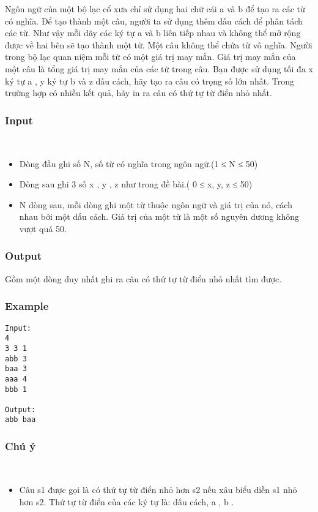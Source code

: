 

Ngôn ngữ của một bộ lạc cổ xưa chỉ sử dụng hai chữ cái a và b để tạo ra các từ có nghĩa. Để tạo thành một câu, người ta sử dụng thêm dấu cách để phân tách các từ. Như vậy mỗi dãy các ký tự a và b liên tiếp nhau và không thể mở rộng được về hai bên sẽ tạo thành một từ. Một câu không thể chứa từ vô nghĩa. Người trong bộ lạc quan niệm mỗi từ có một giá trị may mắn. Giá trị may mắn của một câu là tổng giá trị may mắn của các từ trong câu. Bạn được sử dụng tối đa x ký tự a , y ký tự b và z dấu cách, hãy tạo ra câu có trọng số lớn nhất. Trong trường hợp có nhiều kết quả, hãy in ra câu có thứ tự từ điển nhỏ nhất.

\subsubsection{Input}

 
\begin{itemize}
	\item Dòng đầu ghi số N, số từ có nghĩa trong ngôn ngữ.(1 ≤ N ≤ 50)
	\item Dòng sau ghi 3 số x , y , z như trong đề bài.( 0 ≤ x, y, z ≤ 50)
	\item N dòng sau, mỗi dòng ghi một từ thuộc ngôn ngữ và giá trị của nó, cách nhau bởi một dấu cách. Giá trị của một từ là một số nguyên dương không vượt quá 50.
\end{itemize}

\subsubsection{Output}

Gồm một dòng duy nhất ghi ra câu có thứ tự từ điển nhỏ nhất tìm được.

\subsubsection{Example}
\begin{verbatim}
Input:
4
3 3 1
abb 3
baa 3
aaa 4
bbb 1

Output:
abb baa
\end{verbatim}

\subsubsection{Chú ý}

 
\begin{itemize}
	\item Câu s1 được gọi là có thứ tự từ điển nhỏ hơn s2 nếu xâu biểu diễn s1 nhỏ hơn s2. Thứ tự từ điển của các ký tự là: dấu cách, a , b .
\end{itemize}
